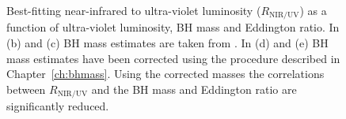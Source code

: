 \begin{figure}
\captionsetup[subfigure]{labelformat=empty}  
  \centering
  \subfloat[\label{fig:correlations_contour_a}]{}
  \subfloat[\label{fig:correlations_contour_b}]{}
  \subfloat[\label{fig:correlations_contour_c}]{}
  \subfloat[\label{fig:correlations_contour_d}]{}
  \subfloat[\label{fig:correlations_contour_e}]{}
  \caption[{Best-fitting near-infrared to ultra-violet luminosity as a function of ultra-violet luminosity, BH mass and Eddington ratio.}]{Best-fitting near-infrared to ultra-violet luminosity ($R_{\text{NIR/UV}}$) as a function of ultra-violet luminosity, BH mass and Eddington ratio. In (b) and (c) BH mass estimates are taken from \citet{shen11}. In (d) and (e) BH mass estimates have been corrected using the procedure described in Chapter~\ref{ch:bhmass}. Using the corrected masses the correlations between $R_{\text{NIR/UV}}$ and the BH mass and Eddington ratio are significantly reduced.}
  \label{fig:correlations_contour}
\end{figure}

